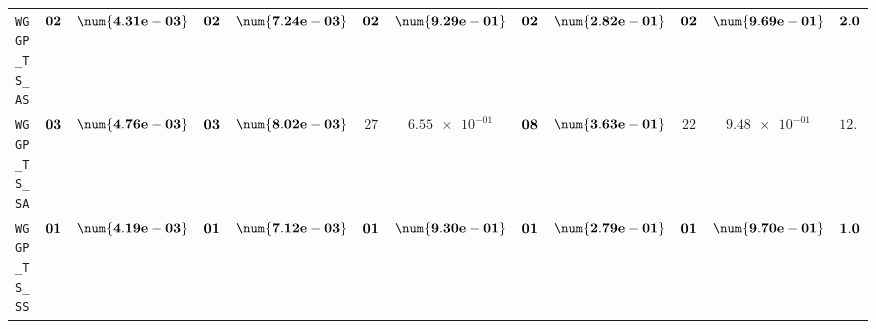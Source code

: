 \begin{xltabular}{\textwidth}{l||cC|cC|cC|cC|cC||c}
	\texttt{WGGP\_TS\_AS} & $\bf 02$ & $\bf \num{4.31e-03}$ & $\bf 02$ & $\bf \num{7.24e-03}$ & $\bf 02$ & $\bf \num{9.29e-01}$ & $\bf 02$ & $\bf \num{2.82e-01}$ & $\bf 02$ & $\bf \num{9.69e-01}$ & $\bf 2.0$  \\
	\texttt{WGGP\_TS\_SA} & $\bf 03$ & $\bf \num{4.76e-03}$ & $\bf 03$ & $\bf \num{8.02e-03}$ & $ 27$ & $ \num{6.55e-01}$ & $\bf 08$ & $\bf \num{3.63e-01}$ & $ 22$ & $ \num{9.48e-01}$ & $ 12.6$  \\
	\texttt{WGGP\_TS\_SS} & $\bf 01$ & $\bf \num{4.19e-03}$ & $\bf 01$ & $\bf \num{7.12e-03}$ & $\bf 01$ & $\bf \num{9.30e-01}$ & $\bf 01$ & $\bf \num{2.79e-01}$ & $\bf 01$ & $\bf \num{9.70e-01}$ & $\bf 1.0$  \\
\end{xltabular}
